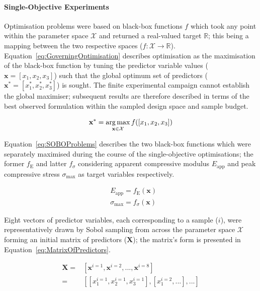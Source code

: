 \paragraph{Single-Objective Experiments}
Optimisation problems were based on black-box functions \(f\) which
 took any point within the parameter space \(\mathcal{X}\) and returned a real-valued
 target \(\mathbb{R}\); this being a mapping between the two respective
 spaces (\(f:\mathcal{X}\rightarrow \mathbb{R}\)).
Equation~\ref{eq:GoverningOptimisation} describes optimisation as the
 maximisation of the black-box function by tuning the predictor variable
 values (\(\mathbf{x}=[x_{1},x_{2},x_{3}]\)) such that the global optimum
 set of predictors (\(\mathbf{x}^{*}=[x_{1}^{*},x_{2}^{*},x_{3}^{*}]\)) is
 sought.
The finite experimental campaign cannot establish the global maximiser; subsequent
 results are therefore described in terms of the best observed formulation within
 the sampled design space and sample budget.

\begin{equation}\label{eq:GoverningOptimisation}
    \mathbf{x}^{*}=\operatorname*{arg\,max}_{\mathbf{x}\in\mathcal{X}} f([x_{1},x_{2},x_{3}])
\end{equation}

Equation~\ref{eq:SOBOProblems} describes the two black-box functions which
 were separately maximised during the course of the single-objective
 optimisations; the former \(f_{\mathrm{E}}\) and latter \(f_{\sigma}\) considering
 apparent compressive modulus \(E_{\text{app}}\) and peak compressive stress
 \(\sigma_{\text{max}}\) as target variables respectively.

\begin{equation}\label{eq:SOBOProblems}
    \begin{split}
        &E_{\text{app}}=f_{\mathrm{E}}(\mathbf{x})\\
        &\sigma_{\text{max}}=f_{\sigma}(\mathbf{x})
    \end{split}
\end{equation}

Eight vectors of predictor variables, each corresponding to a sample (\(i\)),
 were representatively drawn by Sobol sampling from across the parameter
 space \(\mathcal{X}\) forming an initial matrix of predictors (\(\mathbf{X}\)); the
 matrix's form is presented in Equation~\ref{eq:MatrixOfPredictors}.

\begin{equation}\label{eq:MatrixOfPredictors}
    \begin{split}
        \mathbf{X}=&[\mathbf{x}^{i=1},\mathbf{x}^{i=2},...,\mathbf{x}^{i=8}]\\
        =&[[x_{1}^{i=1},x_{2}^{i=1},x_{3}^{i=1}],[x_{1}^{i=2},...],...]
    \end{split}
\end{equation}

